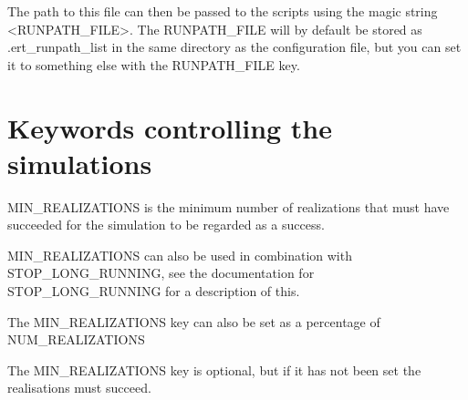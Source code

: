 \documentclass[a4paper,10pt,english]{sphinxmanual}
\begin{document}
The path to this file can then be passed to the scripts using the
magic string \textless{}RUNPATH\_FILE\textgreater{}. The RUNPATH\_FILE will by default be
stored as .ert\_runpath\_list in the same directory as the configuration
file, but you can set it to something else with the RUNPATH\_FILE key.


\section{Keywords controlling the simulations}
\label{\detokenize{keywords/index:keywords-controlling-the-simulations}}\label{\detokenize{keywords/index:id3}}\label{\detokenize{keywords/index:min-realizations}}
\begin{sphinxShadowBox}

MIN\_REALIZATIONS is the minimum number of realizations that
must have succeeded for the simulation to be regarded as a
success.

MIN\_REALIZATIONS can also be used in combination with
STOP\_LONG\_RUNNING, see the documentation for STOP\_LONG\_RUNNING
for a description of this.


%
\begin{sphinxVerbatim}[commandchars=\\\{\}]
  
\end{sphinxVerbatim}

The MIN\_REALIZATIONS key can also be set as a percentage of
NUM\_REALIZATIONS

%
\begin{sphinxVerbatim}[commandchars=\\\{\}]
  
\end{sphinxVerbatim}

The MIN\_REALIZATIONS key is optional, but if it has not been
set  the realisations must succeed.
\end{sphinxShadowBox}
\label{\detokenize{keywords/index:stop-long-running}}
\end{document}
